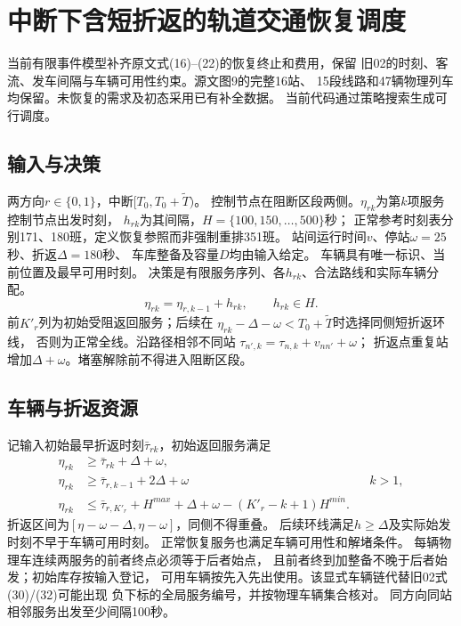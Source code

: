 \documentclass{ctexart}
\begin{document}
\section*{中断下含短折返的轨道交通恢复调度}
当前有限事件模型补齐原文式(16)--(22)的恢复终止和费用，保留
旧02的时刻、客流、发车间隔与车辆可用性约束。源文图9的完整16站、
15段线路和47辆物理列车均保留。未恢复的需求及初态采用已有补全数据。
当前代码通过策略搜索生成可行调度。

\subsection*{输入与决策}
两方向$r\in\{0,1\}$，中断$[T_0,T_0+\widetilde T)$。
控制节点在阻断区段两侧。$\eta_{rk}$为第$k$项服务控制节点出发时刻，
$h_{rk}$为其间隔，$H=\{100,150,\ldots,500\}$秒；
正常参考时刻表分别171、180班，定义恢复参照而非强制重排351班。
站间运行时间$v$、停站$\omega=25$秒、折返$\Delta=180$秒、
车库整备及容量$D$均由输入给定。
车辆具有唯一标识、当前位置及最早可用时刻。
决策是有限服务序列、各$h_{rk}$、合法路线和实际车辆分配。
\[
\eta_{rk}=\eta_{r,k-1}+h_{rk},\qquad h_{rk}\in H.
\]
前$K'_r$列为初始受阻返回服务；后续在
$\eta_{rk}-\Delta-\omega<T_0+\widetilde T$时选择同侧短折返环线，
否则为正常全线。沿路径相邻不同站
$\tau_{n',k}=\tau_{n,k}+v_{nn'}+\omega$；
折返点重复站增加$\Delta+\omega$。堵塞解除前不得进入阻断区段。

\subsection*{车辆与折返资源}
记输入初始最早折返时刻$\bar\tau_{rk}$，初始返回服务满足
\begin{align*}
\eta_{rk}&\ge\bar\tau_{rk}+\Delta+\omega,\\
\eta_{rk}&\ge\bar\tau_{r,k-1}+2\Delta+\omega &&k>1,\\
\eta_{rk}&\le\bar\tau_{r,K'_r}+H^{max}+\Delta+\omega
 -(K'_r-k+1)H^{min}.
\end{align*}
折返区间为$[\eta-\omega-\Delta,\eta-\omega]$，同侧不得重叠。
后续环线满足$h\ge\Delta$及实际始发时刻不早于车辆可用时刻。
正常恢复服务也满足车辆可用性和解堵条件。
每辆物理车连续两服务的前者终点必须等于后者始点，
且前者终到加整备不晚于后者始发；初始库存按输入登记，
可用车辆按先入先出使用。该显式车辆链代替旧02式(30)/(32)可能出现
负下标的全局服务编号，并按物理车辆集合核对。
同方向同站相邻服务出发至少间隔100秒。
\end{document}
